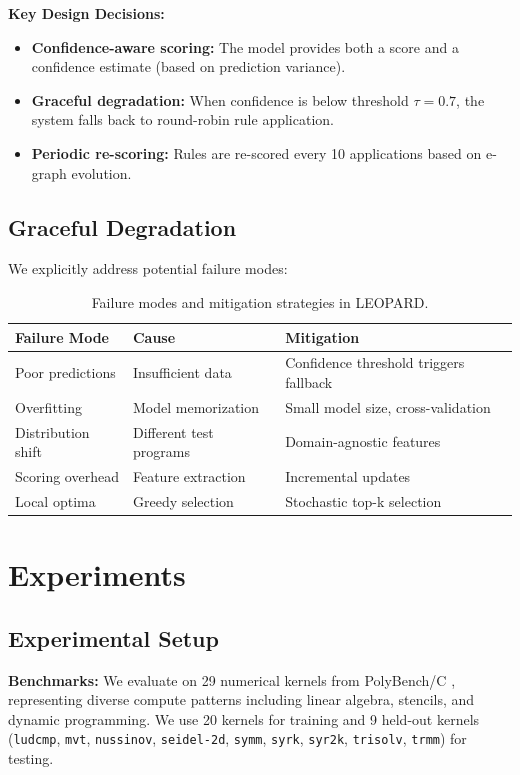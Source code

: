 \documentclass{article}
\begin{document}
\textbf{Key Design Decisions:}
\begin{itemize}
    \item \textbf{Confidence-aware scoring:} The model provides both a score and a confidence estimate (based on prediction variance).
    \item \textbf{Graceful degradation:} When confidence is below threshold $\tau = 0.7$, the system falls back to round-robin rule application.
    \item \textbf{Periodic re-scoring:} Rules are re-scored every 10 applications based on e-graph evolution.
\end{itemize}

\subsection{Graceful Degradation}

We explicitly address potential failure modes:

\begin{table}[h]
\centering
\small
\caption{Failure modes and mitigation strategies in LEOPARD.}
\begin{tabular}{lll}
\toprule
\textbf{Failure Mode} & \textbf{Cause} & \textbf{Mitigation} \\
\midrule
Poor predictions & Insufficient data & Confidence threshold triggers fallback \\
Overfitting & Model memorization & Small model size, cross-validation \\
Distribution shift & Different test programs & Domain-agnostic features \\
Scoring overhead & Feature extraction & Incremental updates \\
Local optima & Greedy selection & Stochastic top-k selection \\
\bottomrule
\end{tabular}
\end{table}

\section{Experiments}
\label{sec:experiments}

\subsection{Experimental Setup}

\textbf{Benchmarks:} We evaluate on 29 numerical kernels from PolyBench/C \citep{pouchet2016polybench}, representing diverse compute patterns including linear algebra, stencils, and dynamic programming. We use 20 kernels for training and 9 held-out kernels (\texttt{ludcmp}, \texttt{mvt}, \texttt{nussinov}, \texttt{seidel-2d}, \texttt{symm}, \texttt{syrk}, \texttt{syr2k}, \texttt{trisolv}, \texttt{trmm}) for testing.
\end{document}
